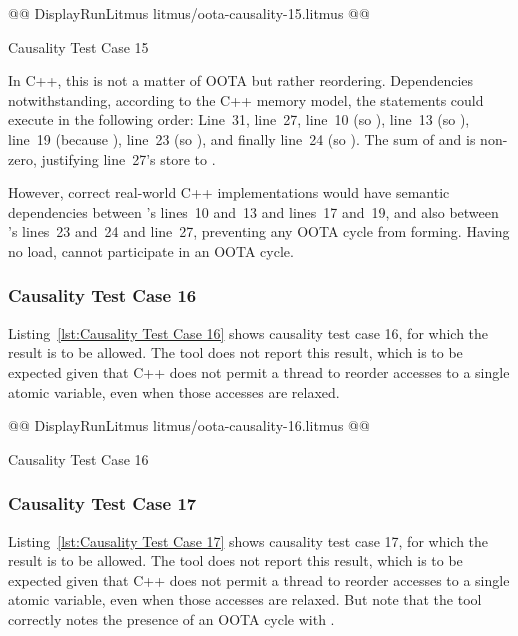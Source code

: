 \documentclass[10]{article}
\begin{document}
\begin{listing}[tbp]
@@ DisplayRunLitmus litmus/oota-causality-15.litmus @@
\caption{Causality Test Case 15}
\label{lst:Causality Test Case 15}
\end{listing}

In C++, this is not a matter of OOTA but rather reordering.
Dependencies notwithstanding, according to the C++ memory model,
the statements could execute in the following order:
Line~31, line~27, line~10 (so ), line~13 (so ),
line~19 (because ), line~23 (so ),
and finally line~24 (so ).
The sum of  and  is non-zero, justifying line~27's
store to .

However, correct real-world C++ implementations would have semantic
dependencies between 's lines~10 and~13 and lines~17 and~19, and also
between 's lines~23 and~24 and line~27, preventing any
OOTA cycle from forming.
Having no load,  cannot participate in an OOTA cycle.

\subsubsection{Causality Test Case 16}
\label{app:Causality Test Case 16}

Listing~\ref{lst:Causality Test Case 16}
shows causality test case 16, for which the 
result is to be allowed.
The  tool does not report this result, which is to be expected
given that C++ does not permit a thread to reorder accesses to a single
atomic variable, even when those accesses are relaxed.

\begin{listing}[tbp]
@@ DisplayRunLitmus litmus/oota-causality-16.litmus @@
\caption{Causality Test Case 16}
\label{lst:Causality Test Case 16}
\end{listing}

\subsubsection{Causality Test Case 17}
\label{app:Causality Test Case 17}

Listing~\ref{lst:Causality Test Case 17}
shows causality test case 17, for which the 
result is to be allowed.
The  tool does not report this result, which is to be expected
given that C++ does not permit a thread to reorder accesses to a single
atomic variable, even when those accesses are relaxed.
But note that the  tool correctly notes the presence of an
OOTA cycle with .
\end{document}
